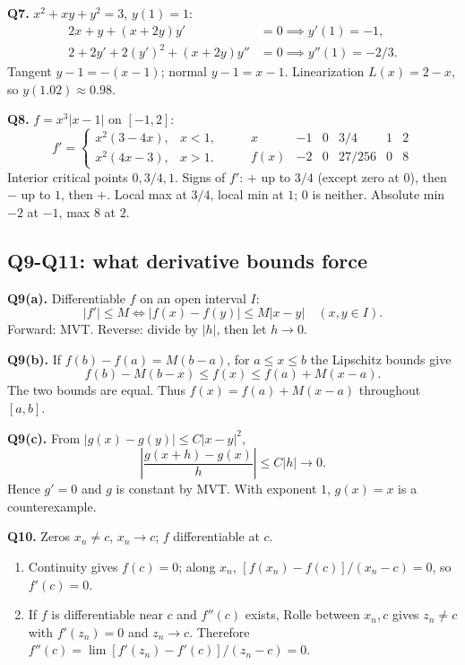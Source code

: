 \documentclass[11pt,letterpaper]{article}
\begin{document}
\textbf{Q7.} \(x^2+xy+y^2=3\), \(y(1)=1\): \[
\begin{aligned}
2x+y+(x+2y)y'&=0\implies y'(1)=-1,\\
2+2y'+2(y')^2+(x+2y)y''&=0\implies y''(1)=-2/3.
\end{aligned}
\] Tangent \(y-1=-(x-1)\); normal \(y-1=x-1\). Linearization
\(L(x)=2-x\), so \(y(1.02)\approx0.98\).

\textbf{Q8.} \(f=x^3|x-1|\) on \([-1,2]\): \[
f'=\begin{cases}x^2(3-4x),&x<1,\\x^2(4x-3),&x>1.\end{cases}
\qquad
\begin{array}{c|ccccc}
x&-1&0&3/4&1&2\\\hline
f(x)&-2&0&27/256&0&8
\end{array}
\] Interior critical points \(0,3/4,1\). Signs of \(f'\): \(+\) up to
\(3/4\) (except zero at \(0\)), then \(-\) up to \(1\), then \(+\).
Local max at \(3/4\), local min at \(1\); \(0\) is neither. Absolute min
\(-2\) at \(-1\), max \(8\) at \(2\).

\subsection{Q9-Q11: what derivative bounds
force}\label{q9-q11-what-derivative-bounds-force}

\textbf{Q9(a).} Differentiable \(f\) on an open interval \(I\): \[
|f'|\le M\iff|f(x)-f(y)|\le M|x-y|\quad(x,y\in I).
\] Forward: MVT. Reverse: divide by \(|h|\), then let \(h\to0\).

\textbf{Q9(b).} If \(f(b)-f(a)=M(b-a)\), for \(a\le x\le b\) the
Lipschitz bounds give \[
f(b)-M(b-x)\le f(x)\le f(a)+M(x-a).
\] The two bounds are equal. Thus \(f(x)=f(a)+M(x-a)\) throughout
\([a,b]\).

\textbf{Q9(c).} From \(|g(x)-g(y)|\le C|x-y|^2\), \[
\left|\frac{g(x+h)-g(x)}h\right|\le C|h|\to0.
\] Hence \(g'=0\) and \(g\) is constant by MVT. With exponent \(1\),
\(g(x)=x\) is a counterexample.

\textbf{Q10.} Zeros \(x_n\ne c\), \(x_n\to c\); \(f\) differentiable at
\(c\).

\begin{enumerate}
\def\labelenumi{(\alph{enumi})}
\item
  Continuity gives \(f(c)=0\); along \(x_n\),
  \([f(x_n)-f(c)]/(x_n-c)=0\), so \(f'(c)=0\).
\item
  If \(f\) is differentiable near \(c\) and \(f''(c)\) exists, Rolle
  between \(x_n,c\) gives \(z_n\ne c\) with \(f'(z_n)=0\) and
  \(z_n\to c\). Therefore \(f''(c)=\lim[f'(z_n)-f'(c)]/(z_n-c)=0\).
\end{enumerate}
\end{document}

